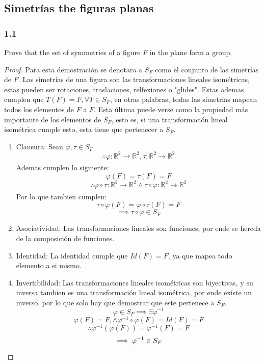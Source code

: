 \documentclass[11pt]{article}
\newcommand{\set}[1]{\mathbb{#1}}
\newcommand{\func}[5]{#1:#2\xrightarrow[#5]{#4}#3}
\theoremstyle{definition}
\begin{document}
\subsection{Simetrías the figuras planas}
\subsubsection{1.1}
Prove that the set of symmetries of a figure $F$ in the plane form a group.
\begin{proof}
    Para esta demostración se denotara a $S_F$ como el conjunto de las simetrías de $F$.
    Las simetrías de una figura son las transformaciones lineales isométricas, estas pueden ser rotaciones, traslaciones, relfexiones o "glides". Estas ademas cumplen que $T(F)=F, \forall T\in S_F$, en otras palabras, todas las simetrias mapean todos los elementos de $F$ a $F$. Esta última puede verse como la propiedad más importante de los elementos de $S_F$, esto es, si una transformación lineal isométrica cumple esto, esta tiene que pertenecer a $S_F$.
    \begin{enumerate}
        \item Clausura: Sean $\varphi, \tau\in S_F$
        \[\therefore \func{\varphi}{\set{R}^2}{\set{R}^2}{}{},\func{\tau}{\set{R}^2}{\set{R}^2}{}{}\]
        Ademas cumplen lo siguiente:
        \[\varphi(F)=\tau(F)=F\]
        \[\therefore\func{\varphi\circ\tau}{\set{R}^2}{\set{R}^2}{}{}\wedge\func{\tau\circ\varphi}{\set{R}^2}{\set{R}^2}{}{}\]
        Por lo que tambien cumplen:
        \[\tau\circ\varphi(F)=\varphi\circ\tau(F)=F\]
        \[\implies \tau\circ\varphi\in S_F\]

        \item Asociatividad: Las transformaciones lineales son funciones, por ende se hereda de la composición de funciones.

        \item Identidad: La identidad cumple que $Id(F)=F$, ya que mapea todo elemento a si mismo.

        \item Invertibilidad: Las transformaciones lineales isométricas son biyectivas, y su inversa tambien es una transformación lineal isométrica, por ende existe un inverso, por lo que solo hay que demostrar que este pertenece a $S_F$.
        \[\varphi\in S_F\implies \exists \varphi^{-1}\]
        \[\varphi(F)=F,\wedge\varphi^{-1}\circ\varphi(F)=Id(F)=F\]
        \[\therefore \varphi^{-1}(\varphi(F))=\varphi^{-1}(F)=F\]
        \[\implies \varphi^{-1}\in S_F\qedhere\]
    \end{enumerate}
\end{proof}
\end{document}
